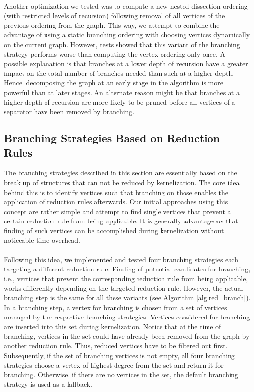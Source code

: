 \documentclass[12pt,a4paper,twoside]{scrartcl}
\numberwithin{equation}{section}
\begin{document}
\paragraph{}
Another optimization we tested was to compute a new nested dissection ordering (with restricted levels of recursion) following removal of all vertices of the previous ordering from the graph. This way, we attempt to combine the advantage of using a static branching ordering with choosing vertices dynamically on the current graph.  However, tests showed that this variant of the branching strategy performs worse than computing the vertex ordering only once. A possible explanation is that branches at a lower depth of recursion have a greater impact on the total number of branches needed than such at a higher depth. Hence, decomposing the graph at an early stage in the algorithm is more powerful than at later stages. An alternate reason might be that branches at a higher depth of recursion are more likely to be pruned before all vertices of a separator have been removed by branching. 

\subsection{Branching Strategies Based on Reduction Rules} \label{red_strats}

The branching strategies described in this section are essentially based on the break up of structures that can not be reduced by kernelization. The core idea behind this is to identify vertices such that branching on those enables the application of reduction rules afterwards. Our initial approaches using this concept are rather simple and attempt to find single vertices that prevent a certain reduction rule from being applicable. It is generally advantageous that finding of such vertices can be accomplished during kernelization without noticeable time overhead.
\paragraph{}
Following this idea, we implemented and tested four branching strategies each targeting a different reduction rule. Finding of potential candidates for branching, i.e., vertices that prevent the corresponding reduction rule from being applicable, works differently depending on the targeted reduction rule. However, the actual branching step is the same for all these variants (see Algorithm \ref{alg:red_branch}). In a branching step, a vertex for branching is chosen from a set of vertices managed by the respective branching strategies. Vertices considered for branching are inserted into this set during kernelization. Notice that at the time of branching, vertices in the set could have already been removed from the graph by another reduction rule. Thus, reduced vertices have to be filtered out first. Subsequently, if the set of branching vertices is not empty, all four branching strategies choose a vertex of highest degree from the set and return it for branching. Otherwise, if there are no vertices in the set, the default branching strategy is used as a fallback.
\end{document}
